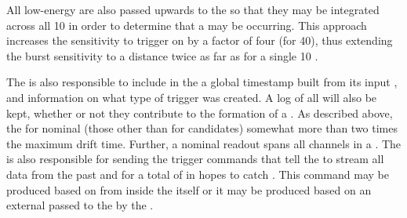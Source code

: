 All low-energy  are also passed upwards to the
 so that they may be integrated across all \SI{10}{\kton}
 in order to determine that a  may be
occurring. 
This approach increases the sensitivity to trigger on  by
a factor of four (for \SI{40}{\kton}), thus extending the burst
sensitivity to a distance twice as far as for a single \SI{10}{\kton}
. 

	
The  is also responsible to include in the
 a global timestamp built from its input
, and information on what type of trigger was
created. 
A log of all  will also be kept, whether or not
they contribute to the formation of a . 
As described above, the  for nominal
 (those other than for  candidates)
somewhat more than two times the maximum drift time. 
Further, a nominal readout spans all channels in a . 
The  is also responsible for sending the trigger commands
that tell the  to stream all data from the past
\snbpretime and for a total of \snbtime in hopes to catch
.
This command may be produced based on  from
inside the  itself or it may be produced based on an external
  passed to the  by the
.
